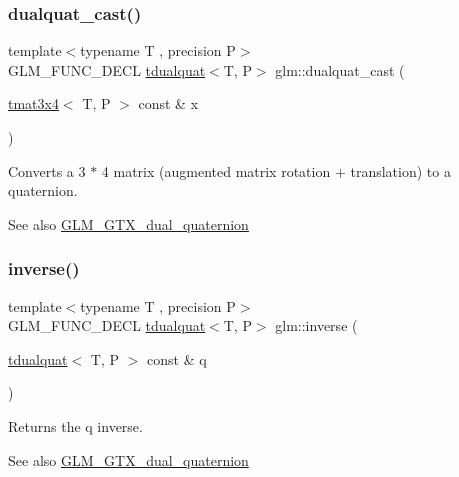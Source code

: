 \subsubsection{\texorpdfstring{dualquat\+\_\+cast()}{dualquat\_cast()}\hspace{0.1cm}{\footnotesize\ttfamily [2/2]}}
{\footnotesize\ttfamily template$<$typename T , precision P$>$ \\
G\+L\+M\+\_\+\+F\+U\+N\+C\+\_\+\+D\+E\+CL \hyperlink{structglm_1_1tdualquat}{tdualquat}$<$T, P$>$ glm\+::dualquat\+\_\+cast (\begin{DoxyParamCaption}\item[{\hyperlink{structglm_1_1tmat3x4}{tmat3x4}$<$ T, P $>$ const \&}]{x }\end{DoxyParamCaption})}

Converts a 3 $\ast$ 4 matrix (augmented matrix rotation + translation) to a quaternion.

\begin{DoxySeeAlso}{See also}
\hyperlink{group__gtx__dual__quaternion}{G\+L\+M\+\_\+\+G\+T\+X\+\_\+dual\+\_\+quaternion} 
\end{DoxySeeAlso}
\mbox{\label{group__gtx__dual__quaternion_ga2149d3cb8af04d9530de0cd16aa1aab2}} 
\subsubsection{\texorpdfstring{inverse()}{inverse()}}
{\footnotesize\ttfamily template$<$typename T , precision P$>$ \\
G\+L\+M\+\_\+\+F\+U\+N\+C\+\_\+\+D\+E\+CL \hyperlink{structglm_1_1tdualquat}{tdualquat}$<$T, P$>$ glm\+::inverse (\begin{DoxyParamCaption}\item[{\hyperlink{structglm_1_1tdualquat}{tdualquat}$<$ T, P $>$ const \&}]{q }\end{DoxyParamCaption})}

Returns the q inverse.

\begin{DoxySeeAlso}{See also}
\hyperlink{group__gtx__dual__quaternion}{G\+L\+M\+\_\+\+G\+T\+X\+\_\+dual\+\_\+quaternion} 
\end{DoxySeeAlso}
\mbox{\label{group__gtx__dual__quaternion_ga8039b88397ca09275be924a26a806a59}} 
